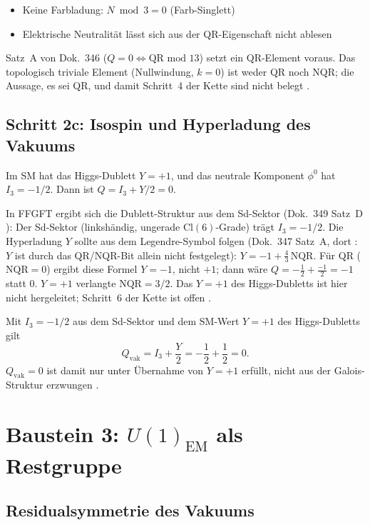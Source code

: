 \begin{itemize}
  \item Keine Farbladung: $N\bmod3 = 0$ (Farb-Singlett) \BM
  \item Elektrische Neutralität lässt sich aus der QR-Eigenschaft nicht ablesen \SM
\end{itemize}

Satz~A von Dok.~346 ($Q=0 \iff \text{QR mod~13}$) setzt ein QR-Element voraus.
Das topologisch triviale Element (Nullwindung, $k=0$) ist weder QR noch NQR;
die Aussage, es sei QR, und damit Schritt~4 der Kette sind nicht belegt \SM.

\subsection*{Schritt 2c: Isospin und Hyperladung des Vakuums}

Im SM hat das Higgs-Dublett $Y=+1$, und das neutrale Komponent
$\phi^0$ hat $I_3=-1/2$. Dann ist $Q=I_3+Y/2=0$.

In FFGFT ergibt sich die Dublett-Struktur aus dem Sd-Sektor (Dok.~349 Satz~D \BM):
Der Sd-Sektor (linkshändig, ungerade Cl$(6)$-Grade) trägt $I_3=-1/2$.
Die Hyperladung $Y$ sollte aus dem Legendre-Symbol folgen (Dok.~347 Satz~A, dort \SM: $Y$ ist durch das QR/NQR-Bit allein nicht festgelegt):
$Y = -1 + \tfrac{4}{3}\,\text{NQR}$. Für QR ($\text{NQR} = 0$) ergibt diese Formel
$Y = -1$, nicht $+1$; dann wäre $Q = -\tfrac12 + \tfrac{-1}{2} = -1$ statt $0$.
$Y = +1$ verlangte $\text{NQR} = 3/2$. Das $Y = +1$ des Higgs-Dubletts ist hier
nicht hergeleitet; Schritt~6 der Kette ist offen \SM.

Mit $I_3=-1/2$ aus dem Sd-Sektor und dem SM-Wert $Y=+1$ des Higgs-Dubletts gilt
\begin{equation}
  Q_\text{vak} = I_3 + \frac{Y}{2} = -\frac{1}{2} + \frac{1}{2} = 0.
  \label{eq:qvak}
\end{equation}
$Q_\text{vak}=0$ ist damit nur unter Übernahme von $Y=+1$ erfüllt, nicht aus der
Galois-Struktur erzwungen \SM.

\section{Baustein 3: $U(1)_\text{EM}$ als Restgruppe}

\subsection*{Residualsymmetrie des Vakuums}

